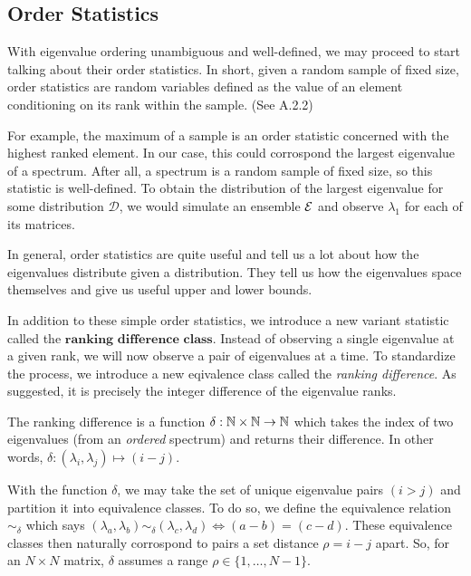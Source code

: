
\subsection{Order Statistics}

With eigenvalue ordering unambiguous and well-defined, we may proceed to start talking about their order statistics. In short, given a random sample of fixed size, order statistics are random variables defined as the value of an element conditioning on its rank within the sample. (See A.2.2)

For example, the maximum of a sample is an order statistic concerned with the highest ranked element. In our case, this could corrospond the largest eigenvalue of a spectrum. After all, a spectrum is a random sample of fixed size, so this statistic is well-defined. To obtain the distribution of the largest eigenvalue for some distribution $\mathcal{D}$, we would simulate an ensemble $\mathcal{E}$ and observe $\lambda_1$ for each of its matrices. 

In general, order statistics are quite useful and tell us a lot about how the eigenvalues distribute given a distribution. They tell us how the eigenvalues space themselves and give us useful upper and lower bounds. 

In addition to these simple order statistics, we introduce a new variant statistic called the $\textbf{ranking difference class}$. Instead of observing a single eigenvalue at a given rank, we will now observe a pair of eigenvalues at a time. To standardize the process, we introduce a new eqivalence class called the \textit{ranking difference}. As suggested, it is precisely the integer difference of the eigenvalue ranks.

\begin{definition}
The ranking difference is a function $\delta: \mathbb{N} \times \mathbb{N} \to \mathbb{N}$ which takes the index of two eigenvalues (from an \textit{ordered} spectrum) and returns their difference. In other words, $\delta : (\lambda_i,\lambda_j) \mapsto (i - j)$.
\end{definition}

With the function $\delta$, we may take the set of unique eigenvalue pairs $(i > j)$ and partition it into equivalence classes. To do so, we define the equivalence relation $\sim_\delta$ which says $(\lambda_a,\lambda_b) \sim_\delta (\lambda_c,\lambda_d) \iff (a -b) = (c-d)$. These equivalence classes then naturally corrospond to pairs a set distance $\rho = i - j$ apart. So, for an $N \times N$ matrix, $\delta$ assumes a range $\rho \in \{ 1,\dots,N-1\}$.

